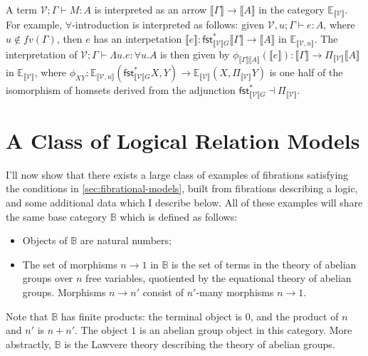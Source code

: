 \documentclass{article}
\newcommand{\cat}[1]{\mathbb{#1}}
\newcommand{\sem}[1]{\llbracket #1 \rrbracket}
\begin{document}
A term $\mathcal{V}; \Gamma \vdash M : A$ is interpreted as an arrow
$\sem{\Gamma} \to \sem{A}$ in the category
$\cat{E}_{\sem{\mathcal{V}}}$. For example, $\forall$-introduction is
interpreted as follows: given $\mathcal{V}, u; \Gamma \vdash e : A$,
where $u \not\in \mathit{fv}(\Gamma)$, then $e$ has an interpetation
$\sem{e} : \mathsf{fst}^*_{\sem{\mathcal{V}}G}\sem{\Gamma} \to
\sem{A}$ in $\cat{E}_{\sem{\mathcal{V},u}}$. The interpretation of
$\mathcal{V}; \Gamma \vdash \Lambda u. e : \forall u. A$ is then given
by $\phi_{\sem{\Gamma}\sem{A}}(\sem{e}) : \sem{\Gamma} \to \Pi_{\sem{\mathcal{V}}}\sem{A}$
in $\cat{E}_{\sem{\mathcal{V}}}$, where $\phi_{XY} :
\cat{E}_{\sem{\mathcal{V},u}}(\mathsf{fst}^*_{\sem{\mathcal{V}}G}X,Y)
\to \cat{E}_{\sem{\mathcal{V}}}(X,\Pi_{\sem{\mathcal{V}}}Y)$ is one
half of the isomorphism of homsets derived from the adjunction
$\mathsf{fst}^*_{\sem{\mathcal{V}}G} \dashv \Pi_{\sem{\mathcal{V}}}$.

\section{A Class of Logical Relation Models}

I'll now show that there exists a large class of examples of
fibrations satisfying the conditions in
\autoref{sec:fibrational-models}, built from fibrations describing a
logic, and some additional data which I describe below. All of these
examples will share the same base category $\cat{B}$ which is defined
as follows:
\begin{itemize}
\item Objects of $\cat{B}$ are natural numbers;
\item The set of morphisms $n \to 1$ in $\cat{B}$ is the set of terms
  in the theory of abelian groups over $n$ free variables, quotiented
  by the equational theory of abelian groups. Morphisms $n \to n'$
  consist of $n'$-many morphisms $n \to 1$.
\end{itemize}
Note that $\cat{B}$ has finite products: the terminal object is $0$,
and the product of $n$ and $n'$ is $n + n'$. The object $1$ is an
abelian group object in this category. More abstractly, $\cat{B}$ is
the Lawvere theory describing the theory of abelian groups.
\end{document}
